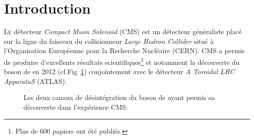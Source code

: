 \chapter*{Introduction}
\renewcommand\chapterillustration{INT/INT}
\ThisULCornerWallPaper{1}{\chapterillustration}

\lettrine[lines=4, slope=-0.5em,nindent=10pt]{L}{e} détecteur \textit{Compact Muon Solenoid} (CMS) est un détecteur généraliste placé sur la ligne du faisceau du collisionneur \textit{Large Hadron Collider} situé à l'Organisation Européenne pour la Recherche Nucléaire (CERN). CMS a permis de produire d'excellents résultats scientifiques\footnote{Plus de \num{600} papiers ont été publiés.} et notamment la découverte du boson de  en \num{2012} (cf.Fig~\ref{higgs}) conjointement avec le détecteur \textit{A Toroidal LHC ApparatuS} (ATLAS). 
\vspace*{-0.4cm}
\begin{figure}[ht!]
	\centering
	\hfill
	\caption{Les deux canaux de désintégration du boson de  ayant permis sa découverte dans l'expérience CMS.}
	\label{higgs}
	\vspace*{-0.3cm}
\end{figure}

